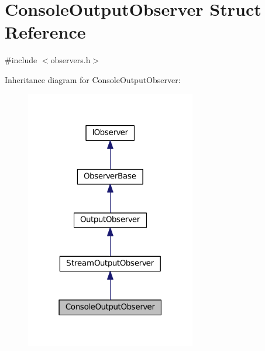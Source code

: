 \hypertarget{struct_console_output_observer}{}\section{Console\+Output\+Observer Struct Reference}
\label{struct_console_output_observer}


{\ttfamily \#include $<$observers.\+h$>$}



Inheritance diagram for Console\+Output\+Observer\+:
\nopagebreak
\begin{figure}[H]
\begin{center}
\leavevmode
\includegraphics[width=211pt]{struct_console_output_observer__inherit__graph}
\end{center}
\end{figure}


